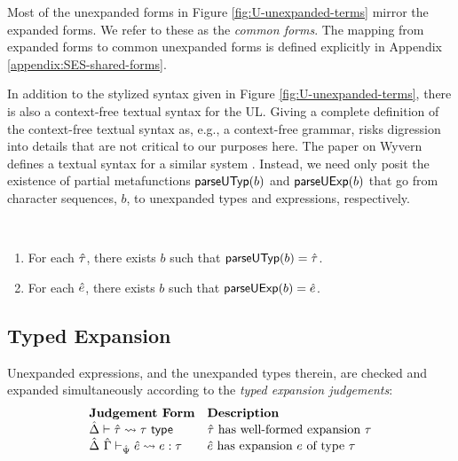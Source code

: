 Most of the unexpanded forms in Figure \ref{fig:U-unexpanded-terms}  mirror the expanded forms. We refer to these as the \emph{common forms}. The mapping from expanded forms to common unexpanded forms is defined explicitly in Appendix \ref{appendix:SES-shared-forms}.



In addition to the stylized syntax given in Figure \ref{fig:U-unexpanded-terms}, there is also a context-free textual syntax for the UL. 
Giving a complete definition of the context-free textual syntax as, e.g., a context-free grammar, risks digression into details that are not critical to our purposes here. The paper on Wyvern defines a textual syntax for a similar system \cite{TSLs}. Instead, we need only posit the existence of partial metafunctions $\mathsf{parseUTyp}(b)$ and $\mathsf{parseUExp}(b)$  that go from character sequences, $b$, to unexpanded types and expressions, respectively. 
\begingroup
\def\thetheorem{\ref{condition:textual-representability-SES}}
\begin{condition} ~
\begin{enumerate}
\item For each ${\hat\tau}$, there exists $b$ such that $\mathsf{parseUTyp}(b)={\hat\tau}$. 
\item For each ${\hat e}$, there exists $b$ such that $\mathsf{parseUExp}(b)={\hat e}$.
\end{enumerate}
\end{condition}
\endgroup

\subsection{Typed Expansion}\label{sec:typed-expansion-U}
Unexpanded expressions, and the unexpanded types therein, are checked and expanded simultaneously according to the \emph{typed expansion judgements}:
\[\begin{array}{ll}
\textbf{Judgement Form} & \textbf{Description}\\
\hat{\Delta} \vdash {\hat\tau} \leadsto \tau~\mathsf{type} & \text{${\hat\tau}$ has well-formed expansion $\tau$}\\
\hat{\Delta}~\hat{\Gamma} \vdash_{\hat{\Psi}} {\hat e} \leadsto e : \tau & \text{${\hat e}$ has expansion $e$ of type $\tau$}\end{array}\]

